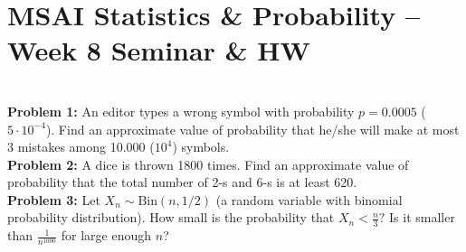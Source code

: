 \documentclass[12pt]{article}
\numberwithin{equation}{section}
\begin{document}
\section*{MSAI Statistics \& Probability – Week 8 Seminar \& HW}\\

\textbf{Problem 1:} An editor types a wrong symbol with probability $p=0.0005$ ($5\cdot10^{-4}$). Find an approximate value of probability that he/she will make at most 3 mistakes among 10.000 ($10^4$) symbols.
\\

\textbf{Problem 2:} A dice is thrown 1800 times. Find an approximate value of probability that the total number of 2-s and 6-s is at least 620.\\

\textbf{Problem 3:} Let $X_n\sim\textrm{Bin}(n,1/2)$ (a random variable with binomial probability distribution). How small is the probability that $X_n<\frac{n}{3}?$ Is it smaller than $\frac{1}{n^{1000}}$ for large enough $n$? 
\end{document}
